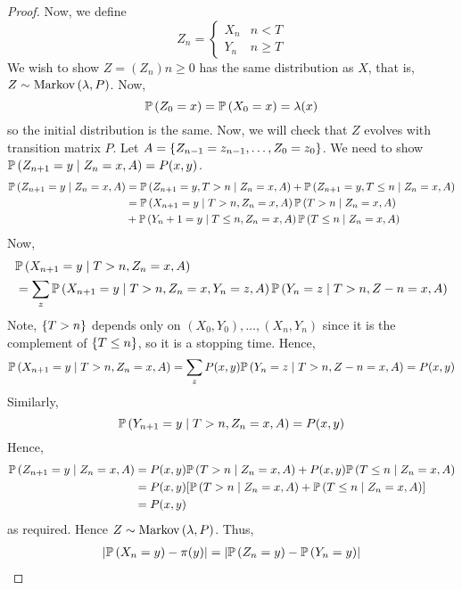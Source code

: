 \begin{proof}
	Now, we define
	\[
		Z_n = \begin{cases}
			X_n & n < T    \\
			Y_n & n \geq T
		\end{cases}
	\]
	We wish to show \( Z = (Z_n){n \geq 0} \) has the same distribution as \( X \), that is, \( Z \sim \operatorname{Markov}\left({\lambda, P}\right) \).
	Now,
	\[
		\mathbb{P}\left({Z_0 = x}\right) = \mathbb{P}\left({X_0 = x}\right) = \lambda(x)
	\]
	so the initial distribution is the same.
	Now, we will check that \( Z \) evolves with transition matrix \( P \).
	Let \( A = \qty{Z_{n-1} = z_{n-1}, \dots, Z_0 = z_0} \).
	We need to show \( \mathbb{P}\left({Z_{n+1} = y \mid Z_n = x, A}\right) = P(x,y) \).
	\begin{align*}
		\mathbb{P}\left({Z_{n+1} = y \mid Z_n = x, A}\right) & = \mathbb{P}\left({Z_{n+1} = y, T > n \mid Z_n = x, A}\right) + \mathbb{P}\left({Z_{n+1} = y, T \leq n \mid Z_n = x, A}\right) \\
		                                   & = \mathbb{P}\left({X_{n+1} = y \mid T > n, Z_n = x, A}\right) \mathbb{P}\left({T > n \mid Z_n = x, A}\right)                   \\
		                                   & + \mathbb{P}\left({Y_n+1 = y \mid T \leq n, Z_n = x, A}\right) \mathbb{P}\left({T \leq n \mid Z_n = x, A}\right)
	\end{align*}
	Now,
	\begin{align*}
		 & \mathbb{P}\left({X_{n+1} = y \mid T > n, Z_n = x, A}\right)                                                       \\
		 & = \sum_z \mathbb{P}\left({X_{n+1} = y \mid T>n, Z_n = x, Y_n = z, A}\right) \mathbb{P}\left({Y_n = z \mid T > n, Z-n = x, A}\right)
	\end{align*}
	Note, \( \qty{T > n} \) depends only on \( (X_0, Y_0), \dots, (X_n, Y_n) \) since it is the complement of \( \qty{T \leq n} \), so it is a stopping time.
	Hence,
	\[
		\mathbb{P}\left({X_{n+1} = y \mid T > n, Z_n = x, A}\right) = \sum_z P(x,y) \mathbb{P}\left({Y_n = z \mid T > n, Z-n = x, A}\right) = P(x,y)
	\]
	Similarly,
	\[
		\mathbb{P}\left({Y_{n+1} = y \mid T > n, Z_n = x, A}\right) = P(x,y)
	\]
	Hence,
	\begin{align*}
		\mathbb{P}\left({Z_{n+1} = y \mid Z_n = x, A}\right) & = P(x,y) \mathbb{P}\left({T > n \mid Z_n = x, A}\right) + P(x,y) \mathbb{P}\left({T \leq n \mid Z_n = x, A}\right)  \\
		                                   & = P(x,y) \qty[ \mathbb{P}\left({T > n \mid Z_n = x, A}\right) + \mathbb{P}\left({T \leq n \mid Z_n = x, A}\right) ] \\
		                                   & = P(x,y)
	\end{align*}
	as required.
	Hence \( Z \sim \operatorname{Markov}\left({\lambda, P}\right) \).
	Thus,
	\begin{align*}
		\abs{\prob{X_n = y} - \pi(y)} & = \abs{\prob{Z_n = y} - \prob{Y_n = y}}                           \\

\end{align*}
\end{proof}
